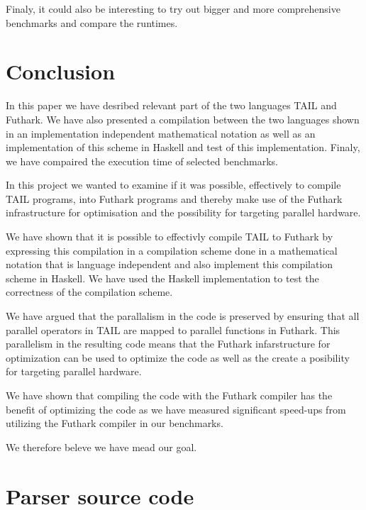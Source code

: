 \documentclass[11pt]{article}
\begin{document}
Finaly, it could also be interesting to try out bigger and more comprehensive benchmarks and compare the runtimes.

\section{Conclusion}
\label{sec:conclusion}


In this paper we have desribed relevant part of the two languages TAIL and Futhark. 
We have also presented a compilation between the two languages shown in an implementation independent mathematical notation as well as an implementation of this scheme in Haskell and test of this implementation. 
Finaly, we have compaired the execution time of selected benchmarks. 

In this project we wanted to examine if it was possible, effectively to compile TAIL programs, into Futhark programs and thereby make use of the Futhark infrastructure for optimisation and the possibility for targeting parallel hardware.

We have shown that it is possible to effectivly compile TAIL to Futhark by expressing this compilation in a compilation scheme done in a mathematical notation that is language independent and also implement this compilation scheme in Haskell. We have used the Haskell implementation to test the correctness of the compilation scheme. 

We have argued that the parallalism in the code is preserved by ensuring that all parallel operators in TAIL are mapped to parallel functions in Futhark. This parallelism in the resulting code means that the Futhark infarstructure for optimization can be used to optimize the code as well as the create a posibility for targeting parallel hardware. 

We have shown that compiling the code with the Futhark compiler has the benefit of optimizing the code as we have measured significant speed-ups from utilizing the Futhark compiler in our benchmarks.

We therefore beleve we have mead our goal. 


{} 


\newpage

\appendix
\section{Parser source code}
\label{app:parser}
\end{document}

